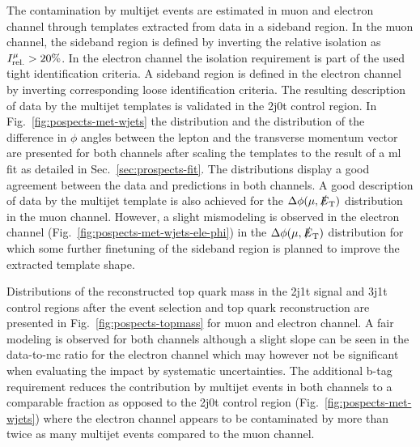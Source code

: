 The contamination by multijet events are estimated in muon and electron channel through templates extracted from data in a sideband region. In the muon channel, the sideband region is defined by inverting the relative isolation as $\muiso>20\%$. In the electron channel the isolation requirement is part of the used tight identification criteria. A sideband region is defined in the electron channel by inverting corresponding loose identification criteria. The resulting description of data by the multijet templates is validated in the 2j0t control region. In Fig.~\ref{fig:pospects-met-wjets} the \met distribution and the distribution of the difference in $\phi$ angles between the lepton and the transverse momentum vector are presented for both channels after scaling the templates to the result of a \gls{ml} fit as detailed in Sec.~\ref{sec:prospects-fit}. The \met distributions display a good agreement between the data and predictions in both channels. A good description of data by the multijet template is also achieved for the $\Delta\phi(\mu,\slashed{E}_{\textrm{T}})$ distribution in the muon channel. However, a slight mismodeling is observed in the electron channel (Fig.~\ref{fig:pospects-met-wjets-ele-phi}) in the $\Delta\phi(\mu,\slashed{E}_{\textrm{T}})$ distribution for which some further finetuning of the sideband region is planned to improve the extracted template shape.

Distributions of the reconstructed top quark mass in the 2j1t signal and 3j1t \ttbar control regions after the event selection and top quark reconstruction are presented in Fig.~\ref{fig:pospects-topmass} for muon and electron channel. A fair modeling is observed for both channels although a slight slope can be seen in the data-to-\gls{mc} ratio for the electron channel which may however not be significant when evaluating the impact by systematic uncertainties. The additional b-tag requirement reduces the contribution by multijet events in both channels to a comparable fraction as opposed to the 2j0t control region (Fig.~\ref{fig:pospects-met-wjets}) where the electron channel appears to be contaminated by more than twice as many multijet events compared to the muon channel. 




